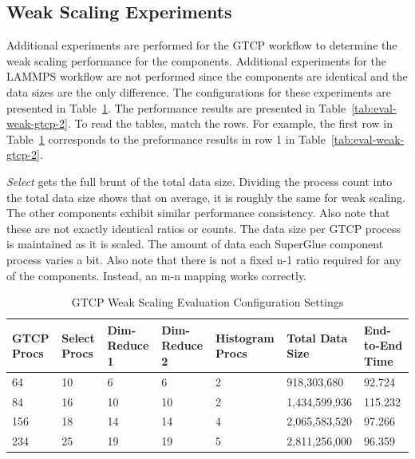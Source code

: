 \documentclass[conference]{IEEEtran}
\begin{document}
\subsection{Weak Scaling Experiments}

Additional experiments are performed for the GTCP workflow to determine the
weak scaling performance for the components. Additional experiments for the
LAMMPS workflow are not performed since the components are identical and the
data sizes are the only difference. The configurations for these experiments
are presented in Table~\ref{tab:eval-weak-gtcp-1}. The performance results are
presented in Table~\ref{tab:eval-weak-gtcp-2}. To read the tables, match the
rows. For example, the first row in Table~\ref{tab:eval-weak-gtcp-1} corresponds
to the preformance results in row 1 in Table~\ref{tab:eval-weak-gtcp-2}.

{\em Select} gets the full brunt of the total data size. Dividing the process
count into the total data size shows that on average, it is roughly the same
for weak scaling. The other components exhibit similar performance consistency.
Also note that these are not exactly identical ratios or counts.  The data size
per GTCP process is maintained as it is scaled. The amount of data each
SuperGlue component process varies a bit. Also note that there is not a fixed
n-1 ratio required for any of the components. Instead, an m-n mapping works
correctly.


\begin{table}[tbp]
\centering
\caption{GTCP Weak Scaling Evaluation Configuration Settings}
\label{tab:eval-weak-gtcp-1}
\vspace{-0.15in}
\begin{tabular}{|l|l|l|l|l|l|l|}
\hline
GTCP Procs & Select Procs & Dim-Reduce 1 & Dim-Reduce 2 & Histogram Procs & Total Data Size & End-to-End Time\\
\hline
64 & 10 & 6 & 6 & 2 & 918,303,680 & 92.724\\
\hline
84 & 16 & 10 & 10 & 2 & 1,434,599,936 & 115.232\\
\hline
156 & 18 & 14 & 14 & 4 & 2,065,583,520 & 97.266\\
\hline
234 & 25 & 19 & 19 & 5 & 2,811,256,000 & 96.359\\
\hline
\end{tabular}
\vspace{-0.15in}
\end{table}
\end{document}

